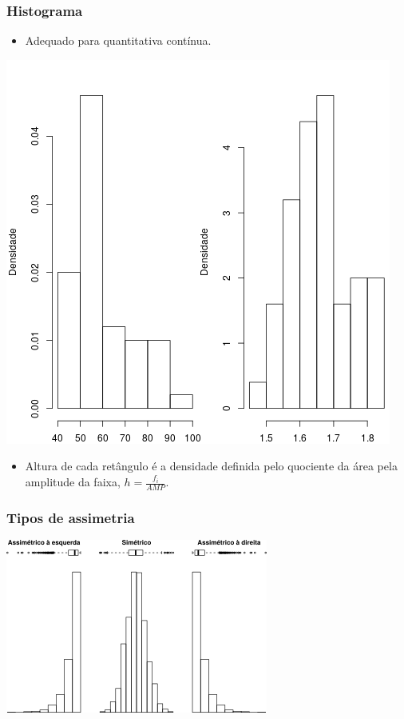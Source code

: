 \documentclass[11pt]{beamer}
\begin{document}
\begin{frame}
\frametitle{Histograma}

\begin{itemize}
\item
  Adequado para quantitativa contínua.
\end{itemize}

\begin{center}\includegraphics[width=0.4\linewidth]{figs/histogram} \end{center}

\begin{itemize}
\item
  Altura de cada retângulo é a densidade definida pelo quociente da área
  pela amplitude da faixa, \(h = \frac{f_i}{AMP}\).
\end{itemize}
\end{frame}

\begin{frame}
\frametitle{Tipos de assimetria}

\begin{center}\includegraphics[width=0.6\linewidth]{figs/hist_simetria} \end{center}
\end{frame}
\end{document}
